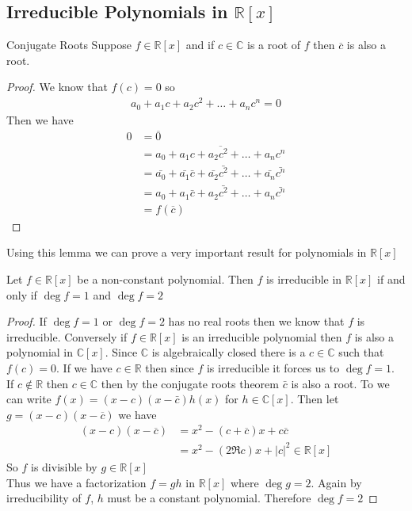 \documentclass[16pt,a4paper]{article}
\theoremstyle{definition}
\newcommand{\C}{\mathbb{C}}
\newcommand{\R}{\mathbb{R}}
\begin{document}
\subsection{Irreducible Polynomials in $\R[x]$}
\begin{lemm}{Conjugate Roots}{}
Suppose $f\in \R[x]$ and if $c\in \C$ is a root of $f$ then $\overline{c}$ is also a root. 
\end{lemm}
\begin{proof}
We know that $f(c) = 0$ so 
\begin{align*}
a_0 + a_1c + a_2c^2 + \ldots + a_nc^n = 0 
\end{align*}
Then we have 
\begin{align*}
0 &= \overline{0} \\
&= \overline{a_0 + a_1c + a_2c^2 + \ldots + a_nc^n}\\
&= \bar{a_0} + \bar{a_1}\bar{c} + \bar{a_2}\bar{c^2} + \ldots + \bar{a_n}\bar{c^n} \\
&= a_0 + a_1 \bar{c} + a_2\bar{c^2} + \ldots +a_n\bar{c^n}\\
&= f(\overline{c})
\end{align*}
\end{proof}
Using this lemma we can prove a very important result for polynomials in $\R[x]$

\begin{thm}{}{}
Let $f\in \R[x]$ be a non-constant polynomial. Then $f$ is irreducible in $\R[x]$ if and only if $\deg f = 1$ and $\deg f = 2$ 
\end{thm}
\begin{proof}
If $\deg f = 1$ or $\deg f = 2$ has no real roots then we know that $f$ is irreducible. Conversely if $f\in \R[x]$ is an irreducible polynomial then $f$ is also a polynomial in $\C[x]$. Since $\C$ is algebraically closed there is a $c\in \C$ such that $f(c) = 0$. If we have $c\in \R$ then since $f$ is irreducible it forces us to $\deg f = 1$.  
\\
If $c\notin \R$ then $c\in \C$ then by the conjugate roots theorem $\bar{c}$ is also a root. To we can write $f(x) = (x-c)(x-\bar{c})h(x)$ for $h\in \C[x]$. Then let $g = (x-c)(x-\overline{c})$ we have 
\begin{align*}
(x-c)(x-\overline{c}) &= x^2 - (c+\overline{c})x + c\overline{c} \\
&= x^2 - (2\Re c)x + |c|^2 \in \R[x]
\end{align*}
So $f$ is divisible by $g\in \R[x]$
\\
Thus we have a factorization $f = gh$ in $\R[x]$ where $\deg g = 2$. Again by irreducibility of $f$, $h$ must be a constant polynomial. Therefore $\deg	 f = 2$      
\end{proof}
\newpage
\end{document}
